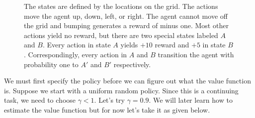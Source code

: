 \documentclass[12pt]{article}
\begin{document}
\begin{figure}[h]
  \centering
  \caption{\footnotesize The states are defined by the locations on the grid. The actions move the agent up, down, left, or right. The agent cannot move off the grid and bumping generates a reward of minus one. Most other actions yield no reward, but there are two special states labeled $A$ and $B$. Every action in state $A$ yields $+10$ reward and $+5$ in state $B$. Correspondingly, every action in $A$ and $B$ transition the agent with probability one to $A'$ and $B'$ respectively.}
\end{figure}

We must first specify the policy before we can figure out what the value function is. Suppose we start with a uniform random policy. Since this is a continuing task, we need to choose $\gamma < 1$. Let's try $\gamma = 0.9$.
We will later learn how to estimate the value function but for now let's take it as given below.
\end{document}
